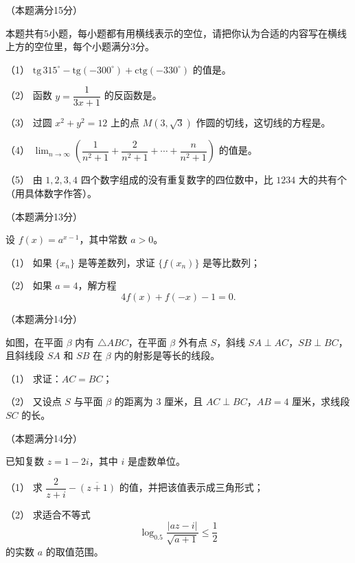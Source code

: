 \begin{question}
（本题满分15分）

本题共有5小题，每小题都有用横线表示的空位，请把你认为合适的内容写在横线上方的空位里，每个小题满分3分。

（1） $\mathrm{tg}\,315^\circ-\mathrm{tg}(-300^\circ)+\mathrm{ctg}(-330^\circ)$ 的值是\gkblank{}。

（2） 函数 $y=\dfrac1{3x+1}$ 的反函数是\gkblank{}。

（3） 过圆 $x^2+y^2=12$ 上的点 $M(3,\sqrt3)$ 作圆的切线，这切线的方程是\gkblank{}。

（4） $\displaystyle\lim_{n\to\infty}\left(\dfrac1{n^2+1}+\dfrac2{n^2+1}+\cdots+\dfrac n{n^2+1}\right)$ 的值是\gkblank{}。

（5） 由 $1,2,3,4$ 四个数字组成的没有重复数字的四位数中，比 $1234$ 大的共有\gkblank{}个（用具体数字作答）。

\end{question}
\begin{question}
（本题满分13分）

设 $f(x)=a^{x-1}$，其中常数 $a>0$。

（1） 如果 $\{x_n\}$ 是等差数列，求证 $\{f(x_n)\}$ 是等比数列；

（2） 如果 $a=4$，解方程
\nopagebreak[4]
\[
4f(x)+f(-x)-1=0.
\]

\Needspace{0.4\textheight}
\end{question}
\begin{question}
（本题满分14分）

如图，在平面 $\beta$ 内有 $\triangle ABC$，在平面 $\beta$ 外有点 $S$，斜线 $SA\perp AC$，$SB\perp BC$，且斜线段 $SA$ 和 $SB$ 在 $\beta$ 内的射影是等长的线段。
\nopagebreak[4]
\begin{center}\end{center}
\nopagebreak[4]
（1） 求证：$AC=BC$；

（2） 又设点 $S$ 与平面 $\beta$ 的距离为 $3$ 厘米，且 $AC\perp BC$，$AB=4$ 厘米，求线段 $SC$ 的长。

\end{question}
\begin{question}
（本题满分14分）

已知复数 $z=1-2i$，其中 $i$ 是虚数单位。

（1） 求 $\dfrac2{z+i}-\overline{(z+1)}$ 的值，并把该值表示成三角形式；

（2） 求适合不等式
\nopagebreak[4]
\[
\log_{0.5}\frac{|az-i|}{\sqrt{a+1}}\le\frac12
\]
的实数 $a$ 的取值范围。

\end{question}

